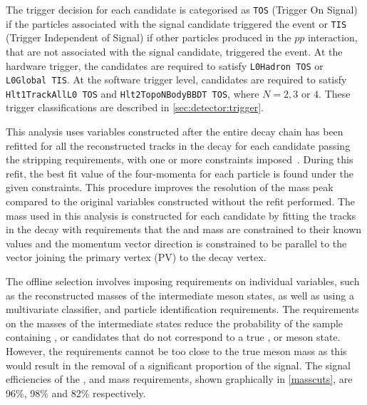 The trigger decision for each candidate is categorised as {\tt TOS} (Trigger On Signal) if the particles associated with the signal candidate triggered the event or {\tt TIS} (Trigger Independent of Signal) if other particles produced in the $pp$ interaction, that are not associated with the signal candidate, triggered the event. At the hardware trigger, the \Bm candidates are required to satisfy {\tt L0Hadron TOS} or {\tt L0Global TIS}. At the software trigger level, \Bm candidates are required to satisfy {\tt Hlt1TrackAllL0 TOS} and {\tt Hlt2TopoNBodyBBDT TOS}, where $N = 2,3 \text{ or } 4$. These trigger classifications are described in \sect\ref{sec:detector:trigger}.

This analysis uses variables constructed after the entire decay chain has been refitted for all the reconstructed tracks in the decay for each \Bm candidate passing the stripping requirements, with one or more constraints imposed~\cite{Hulsbergen:2005pu}. During this refit, the best fit value of the four-momenta for each particle is found under the given constraints. This procedure improves the resolution of the \Bm mass peak compared to the original variables constructed without the refit performed. The \Bm mass used in this analysis is constructed for each \Bm candidate by fitting the tracks in the decay with requirements that the \Dz and \KS mass are constrained to their known values and the \Bm momentum vector direction is constrained to be parallel to the vector joining the primary vertex (PV) to the \Bm decay vertex.

The offline selection involves imposing requirements on individual variables, such as the reconstructed masses of the intermediate meson states, as well as using a multivariate classifier, and particle identification requirements. The requirements on the masses of the intermediate states reduce the probability of the sample containing \Dz, \KS or \Kstar candidates that do not correspond to a true \Dz, \KS or \Kstar meson state. However, the requirements cannot be too close to the true meson mass as this would result in the removal of a significant proportion of the signal. The signal efficiencies of the \Dz, \KS and \Kstar mass requirements, shown graphically in \fig\ref{masscuts}, are 96\%, 98\% and 82\% respectively. 

